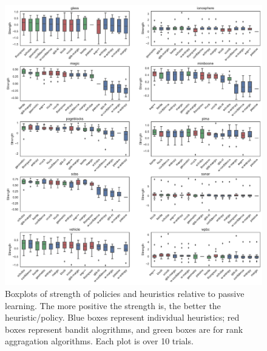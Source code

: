 \documentclass[fleqn,10pt,lineno]{wlpeerj} %
\begin{document}
\begin{figure}[tbp]
	\centering
	\includegraphics[width=\textwidth]{figures/strengths}
	\caption[Policy strength]{Boxplots of strength of policies and heuristics
	relative to passive learning. The more positive the strength is, the better
	the heuristic/policy. Blue boxes represent individual heuristics; red boxes
	represent bandit alogrithms, and green boxes are for rank aggragation
	algorithms. Each plot is over 10 trials.}
	\label{fig:strengths}
\end{figure}
\end{document}
